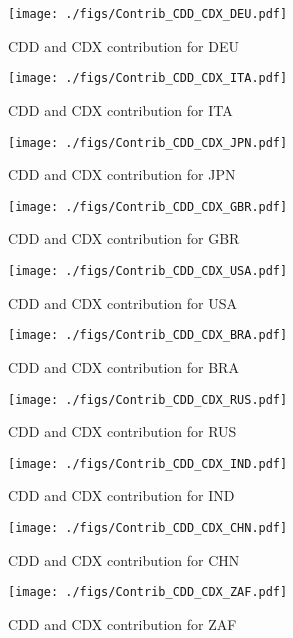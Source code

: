 \documentclass[11pt]{article}
\begin{document}
\begin{figure}[t]
\centering
\texttt{[image: ./figs/Contrib\_CDD\_CDX\_DEU.pdf]}
\caption{CDD and CDX contribution for DEU}
\end{figure}

\begin{figure}[t]
\centering
\texttt{[image: ./figs/Contrib\_CDD\_CDX\_ITA.pdf]}
\caption{CDD and CDX contribution for ITA}
\end{figure}

\begin{figure}[t]
\centering
\texttt{[image: ./figs/Contrib\_CDD\_CDX\_JPN.pdf]}
\caption{CDD and CDX contribution for JPN}
\end{figure}

\begin{figure}[t]
\centering
\texttt{[image: ./figs/Contrib\_CDD\_CDX\_GBR.pdf]}
\caption{CDD and CDX contribution for GBR}
\end{figure}

\begin{figure}[t]
\centering
\texttt{[image: ./figs/Contrib\_CDD\_CDX\_USA.pdf]}
\caption{CDD and CDX contribution for USA}
\end{figure}

\begin{figure}[t]
\centering
\texttt{[image: ./figs/Contrib\_CDD\_CDX\_BRA.pdf]}
\caption{CDD and CDX contribution for BRA}
\end{figure}

\begin{figure}[t]
\centering
\texttt{[image: ./figs/Contrib\_CDD\_CDX\_RUS.pdf]}
\caption{CDD and CDX contribution for RUS}
\end{figure}

\begin{figure}[t]
\centering
\texttt{[image: ./figs/Contrib\_CDD\_CDX\_IND.pdf]}
\caption{CDD and CDX contribution for IND}
\end{figure}

\begin{figure}[t]
\centering
\texttt{[image: ./figs/Contrib\_CDD\_CDX\_CHN.pdf]}
\caption{CDD and CDX contribution for CHN}
\end{figure}

\begin{figure}[t]
\centering
\texttt{[image: ./figs/Contrib\_CDD\_CDX\_ZAF.pdf]}
\caption{CDD and CDX contribution for ZAF}
\end{figure}
\end{document}
